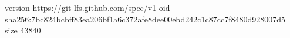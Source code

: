 version https://git-lfs.github.com/spec/v1
oid sha256:7bc824bcbff83ea206bf1a6c372afe8dee00ebd242c1c87cc7f8480d928007d5
size 43840
